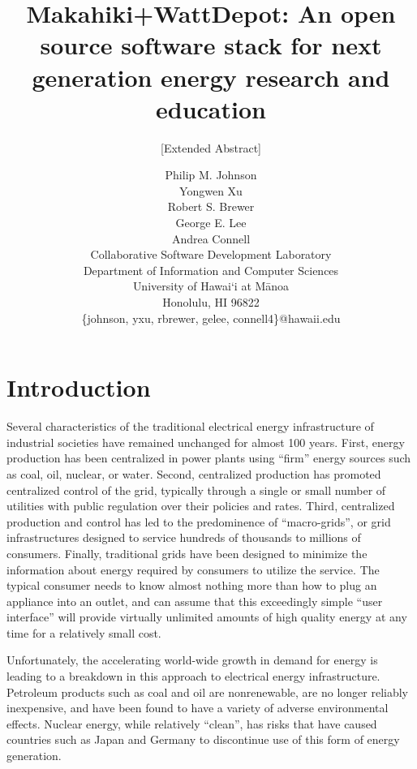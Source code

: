 \documentclass{acm_proc_article-sp}
\begin{document}
\title{Makahiki+WattDepot: An open source software stack for 
next generation energy research and education}
\subtitle{[Extended Abstract]}

\author{Philip M. Johnson\\
        Yongwen Xu\\
        Robert S. Brewer\\
        George E. Lee\\
        Andrea Connell\\
        Collaborative Software Development Laboratory\\
        Department of Information and Computer Sciences\\
        University of Hawai`i at M\=anoa\\
        Honolulu, HI 96822\\
        \{johnson, yxu, rbrewer, gelee, connell4\}@hawaii.edu\\
}


\maketitle

\section{Introduction}

Several characteristics of the traditional electrical energy infrastructure
of industrial societies have remained unchanged for almost 100 years.  First, energy
production has been centralized in power plants using ``firm'' energy sources such as coal, oil,
nuclear, or water.  Second, centralized production
has promoted centralized control of the grid, typically through a single or small number of
utilities with public regulation over their policies and rates.  Third, centralized
production and control has led to the predominence of ``macro-grids'', or grid
infrastructures designed to service hundreds of thousands to millions of
consumers. Finally, traditional grids have been designed to minimize the information about
energy required by consumers to utilize the service.  The typical consumer needs to know
almost nothing more than how to plug an appliance into an outlet, and can
assume that this exceedingly simple ``user interface'' will provide virtually unlimited
amounts of high quality energy at any time for a relatively small cost.

Unfortunately, the accelerating world-wide growth in demand for energy is
leading to a breakdown in this approach to electrical energy infrastructure.  Petroleum
products such as coal and oil are nonrenewable, are no longer reliably inexpensive, and
have been found to have a variety of adverse environmental effects.  Nuclear energy, while
relatively ``clean'', has risks that have caused countries such as Japan and Germany to
discontinue use of this form of energy generation.  
\end{document}
